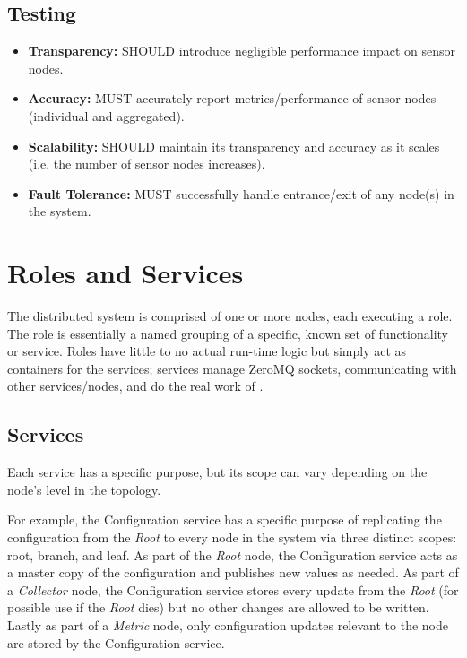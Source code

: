 \subsection{Testing}

\begin{itemize}

\item \textbf{Transparency:} \dcamp SHOULD introduce negligible performance impact on sensor nodes.
\item \textbf{Accuracy:} \dcamp MUST accurately report metrics/performance of sensor nodes (individual and aggregated).
\item \textbf{Scalability:} \dcamp SHOULD maintain its transparency and accuracy as it scales (i.e. the number of sensor
      nodes increases).
\item \textbf{Fault Tolerance:} \dcamp MUST successfully handle entrance/exit of any node(s) in the system.

\end{itemize}

\section{\dcamp Roles and Services}
\label{roles_and_services}

The \dcamp distributed system is comprised of one or more nodes, each executing a role. The role is essentially a named
grouping of a specific, known set of functionality or service. Roles have little to no actual run-time logic but simply
act as containers for the services; services manage ZeroMQ sockets, communicating with other services/nodes, and do the
real work of \dcamp.

\subsection{Services}

Each \dcamp service has a specific purpose, but its scope can vary depending on the node's level in the \dcamp topology.

For example, the Configuration service has a specific purpose of replicating the \dcamp configuration from the
\textit{Root} to every node in the system via three distinct scopes: root, branch, and leaf. As part of the
\textit{Root} node, the Configuration service acts as a master copy of the configuration and publishes new values as
needed. As part of a \textit{Collector} node, the Configuration service stores every update from the \textit{Root} (for
possible use if the \textit{Root} dies) but no other changes are allowed to be written. Lastly as part of a
\textit{Metric} node, only configuration updates relevant to the node are stored by the Configuration service.

